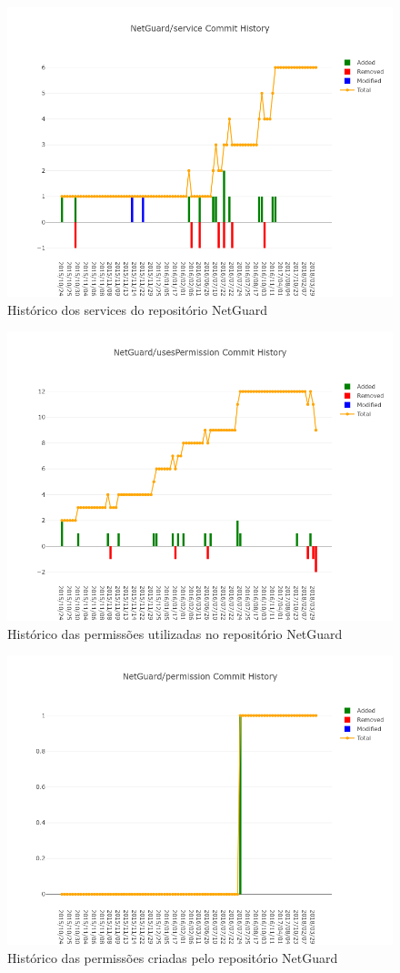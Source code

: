 \documentclass[a4paper,12pt]{article}
\begin{document}
{%
\begin{figure}[H]
\centering
\includegraphics[width=\linewidth,height=0.5\linewidth]{imgs/NetGuard_service_history.png}
\caption{Histórico dos services do repositório NetGuard}
\label{fig:reposervice}
\end{figure}

\begin{figure}[H]
\centering
\includegraphics[width=\linewidth,height=0.5\linewidth]{imgs/NetGuard_usesPermission_history.png}
\caption{Histórico das permissões utilizadas no repositório NetGuard}
\label{fig:repouses}
\end{figure}

\begin{figure}[H]
\centering
\includegraphics[width=\linewidth,height=0.5\linewidth]{imgs/NetGuard_permission_history.png}
\caption{Histórico das permissões criadas pelo repositório NetGuard}
\label{fig:repopermission}
\end{figure}




}
\end{document}
